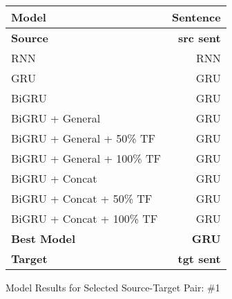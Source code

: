 \documentclass[twoside,twocolumn]{article}
\begin{document}
\begin{figure*}
    \centering
    \begin{tabular}{ |l|r| }
        \hline
        \textbf{Model}
          & \textbf{Sentence} \\
        \hline
        \textbf{Source} & \textbf{src sent} \\ \hline
        RNN & RNN \\ \hline
        GRU & GRU \\ \hline
        BiGRU & GRU \\ \hline
        BiGRU + General & GRU \\ \hline
        BiGRU + General + 50\% TF & GRU \\ \hline
        BiGRU + General + 100\% TF & GRU \\ \hline
        BiGRU + Concat & GRU \\ \hline
        BiGRU + Concat + 50\% TF & GRU \\ \hline
        BiGRU + Concat + 100\% TF & GRU \\ \hline
        \textbf{Best Model} & \textbf{GRU} \\ \hline
        \textbf{Target} & \textbf{tgt sent} \\ \hline
    \end{tabular}

    \caption{Model Results for Selected Source-Target Pair: \#1}
    \label{fig:model-results}
\end{figure*}
\end{document}
